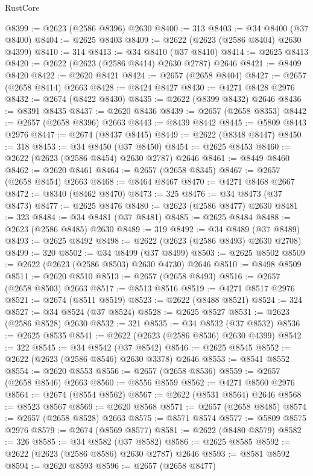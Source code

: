 \begin{lexlean}{RustCore}
\begin{coremodule}
@8399 := @2623 (@2586 @8396) @2630
@8400 := 313
@8403 := @34 @8400 (@37 @8400)
@8404 := @2625 @8403
@8409 := @2622 (@2623 (@2586 @8404) @2630 @4399)
@8410 := 314
@8413 := @34 @8410 (@37 @8410)
@8414 := @2625 @8413
@8420 := @2622 (@2623 (@2586 @8414) @2630 @2787) @2646
@8421 := @8409 @8420
@8422 := @2620 @8421
@8424 := @2657 (@2658 @8404)
@8427 := @2657 (@2658 @8414) @2663
@8428 := @8424 @8427
@8430 := @4271 @8428 @2976
@8432 := @2674 (@8422 @8430)
@8435 := @2622 (@8399 @8432) @2646
@8436 := @8391 @8435
@8437 := @2620 @8436
@8439 := @2657 (@2658 @8353)
@8442 := @2657 (@2658 @8396) @2663
@8443 := @8439 @8442
@8445 := @5809 @8443 @2976
@8447 := @2674 (@8437 @8445)
@8449 := @2622 (@8348 @8447)
@8450 := 318
@8453 := @34 @8450 (@37 @8450)
@8454 := @2625 @8453
@8460 := @2622 (@2623 (@2586 @8454) @2630 @2787) @2646
@8461 := @8449 @8460
@8462 := @2620 @8461
@8464 := @2657 (@2658 @8345)
@8467 := @2657 (@2658 @8454) @2663
@8468 := @8464 @8467
@8470 := @4271 @8468 @2667
@8472 := @8340 (@8462 @8470)
@8473 := 325
@8476 := @34 @8473 (@37 @8473)
@8477 := @2625 @8476
@8480 := @2623 (@2586 @8477) @2630
@8481 := 323
@8484 := @34 @8481 (@37 @8481)
@8485 := @2625 @8484
@8488 := @2623 (@2586 @8485) @2630
@8489 := 319
@8492 := @34 @8489 (@37 @8489)
@8493 := @2625 @8492
@8498 := @2622 (@2623 (@2586 @8493) @2630 @2708)
@8499 := 320
@8502 := @34 @8499 (@37 @8499)
@8503 := @2625 @8502
@8509 := @2622 (@2623 (@2586 @8503) @2630 @4730) @2646
@8510 := @8498 @8509
@8511 := @2620 @8510
@8513 := @2657 (@2658 @8493)
@8516 := @2657 (@2658 @8503) @2663
@8517 := @8513 @8516
@8519 := @4271 @8517 @2976
@8521 := @2674 (@8511 @8519)
@8523 := @2622 (@8488 @8521)
@8524 := 324
@8527 := @34 @8524 (@37 @8524)
@8528 := @2625 @8527
@8531 := @2623 (@2586 @8528) @2630
@8532 := 321
@8535 := @34 @8532 (@37 @8532)
@8536 := @2625 @8535
@8541 := @2622 (@2623 (@2586 @8536) @2630 @4399)
@8542 := 322
@8545 := @34 @8542 (@37 @8542)
@8546 := @2625 @8545
@8552 := @2622 (@2623 (@2586 @8546) @2630 @3378) @2646
@8553 := @8541 @8552
@8554 := @2620 @8553
@8556 := @2657 (@2658 @8536)
@8559 := @2657 (@2658 @8546) @2663
@8560 := @8556 @8559
@8562 := @4271 @8560 @2976
@8564 := @2674 (@8554 @8562)
@8567 := @2622 (@8531 @8564) @2646
@8568 := @8523 @8567
@8569 := @2620 @8568
@8571 := @2657 (@2658 @8485)
@8574 := @2657 (@2658 @8528) @2663
@8575 := @8571 @8574
@8577 := @5809 @8575 @2976
@8579 := @2674 (@8569 @8577)
@8581 := @2622 (@8480 @8579)
@8582 := 326
@8585 := @34 @8582 (@37 @8582)
@8586 := @2625 @8585
@8592 := @2622 (@2623 (@2586 @8586) @2630 @2787) @2646
@8593 := @8581 @8592
@8594 := @2620 @8593
@8596 := @2657 (@2658 @8477)

\end{coremodule}
\end{lexlean}
